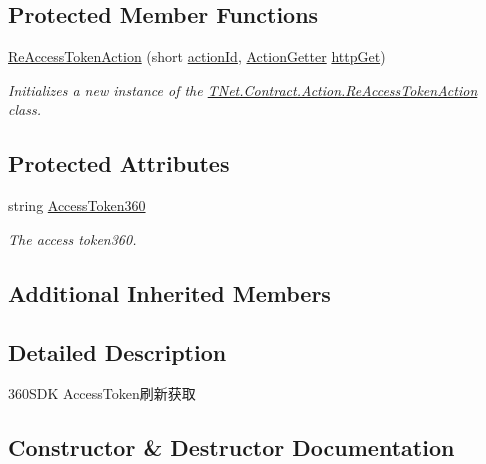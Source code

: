 \subsection*{Protected Member Functions}
\begin{DoxyCompactItemize}
\item 
\mbox{\hyperlink{class_t_net_1_1_contract_1_1_action_1_1_re_access_token_action_a008b180d964095c1e5a1f732b6da428a}{Re\+Access\+Token\+Action}} (short \mbox{\hyperlink{class_t_net_1_1_service_1_1_game_struct_a8c3c761a891a0da9d72d17d34a0f7446}{action\+Id}}, \mbox{\hyperlink{class_t_net_1_1_service_1_1_action_getter}{Action\+Getter}} \mbox{\hyperlink{class_t_net_1_1_service_1_1_base_struct_a04c1171f14d9ee44612f9966a8d61d30}{http\+Get}})
\begin{DoxyCompactList}\small\item\em Initializes a new instance of the \mbox{\hyperlink{class_t_net_1_1_contract_1_1_action_1_1_re_access_token_action}{T\+Net.\+Contract.\+Action.\+Re\+Access\+Token\+Action}} class. \end{DoxyCompactList}\end{DoxyCompactItemize}
\subsection*{Protected Attributes}
\begin{DoxyCompactItemize}
\item 
string \mbox{\hyperlink{class_t_net_1_1_contract_1_1_action_1_1_re_access_token_action_aeaa8f91d5015e0e7651ac00d92b0568c}{Access\+Token360}}
\begin{DoxyCompactList}\small\item\em The access token360. \end{DoxyCompactList}\end{DoxyCompactItemize}
\subsection*{Additional Inherited Members}


\subsection{Detailed Description}
360\+S\+DK Access\+Token刷新获取 



\subsection{Constructor \& Destructor Documentation}
\mbox{\label{class_t_net_1_1_contract_1_1_action_1_1_re_access_token_action_a008b180d964095c1e5a1f732b6da428a}} 
